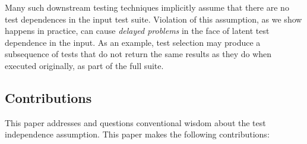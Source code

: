 Many such downstream testing techniques implicitly assume that
there are no test dependences in the input test suite. Violation of
this assumption, as we show happens in practice, can cause \emph{delayed problems} in the face
of latent test dependence in the input.  As an
example, test selection may produce a subsequence of tests that do not
return the same results as they do when executed originally, as part of the full suite.


\subsection{Contributions}
\label{sec:contributions}

This paper addresses and questions
conventional wisdom about the test independence assumption. 
This paper makes the following contributions:

